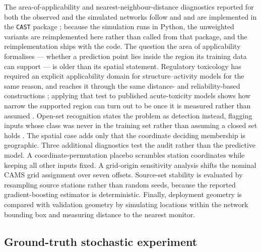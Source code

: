 The area-of-applicability and nearest-neighbour-distance diagnostics reported for both the observed and the simulated networks follow \citet{meyer2021aoa} and \citet{mila2024proxies} and are implemented in the \texttt{CAST} package \citep{meyer2024cast}; because the simulation runs in Python, the unweighted variants are reimplemented here rather than called from that package, and the reimplementation ships with the code. The question the area of applicability formalises --- whether a prediction point lies inside the region its training data can support --- is older than its spatial statement. Regulatory toxicology has required an explicit applicability domain for structure--activity models for the same reason, and reaches it through the same distance- and reliability-based constructions \citep{toplak2014,jang2025qsar}; applying that test to published acute-toxicity models shows how narrow the supported region can turn out to be once it is measured rather than assumed \citep{fisher2025ad}. Open-set recognition states the problem as detection instead, flagging inputs whose class was never in the training set rather than assuming a closed set holds \citep{kang2026openset}. The spatial case adds only that the coordinate deciding membership is geographic. Three additional diagnostics test the audit rather than the predictive model. A coordinate-permutation placebo scrambles station coordinates while keeping all other inputs fixed. A grid-origin sensitivity analysis shifts the nominal CAMS grid assignment over seven offsets. Source-set stability is evaluated by resampling source stations rather than random seeds, because the reported gradient-boosting estimator is deterministic. Finally, deployment geometry is compared with validation geometry by simulating locations within the network bounding box and measuring distance to the nearest monitor.

\subsection{Ground-truth stochastic experiment}

